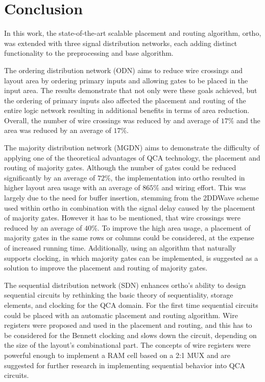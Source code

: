 \chapter{Conclusion}

In this work, the state-of-the-art scalable placement and routing algorithm, ortho, was extended with three signal distribution networks, each adding distinct functionality to the preprocessing and base algorithm.

The ordering distribution network (ODN) aims to reduce wire crossings and layout area by ordering primary inputs and allowing gates to be placed in the input area. The results demonstrate that not only were these goals achieved, but the ordering of primary inputs also affected the placement and routing of the entire logic network resulting in additional benefits in terms of area reduction. Overall, the number of wire crossings was reduced by and average of $17\%$ and the area was reduced by an average of $17\%$.

The majority distribution network (MGDN) aims to demonstrate the difficulty of applying one of the theoretical advantages of QCA technology, the placement and routing of majority gates. Although the number of gates could be reduced significantly by an average of $72\%$, the implementation into ortho resulted in higher layout area usage with an average of $865\%$ and wiring effort. This was largely due to the need for buffer insertion, stemming from the 2DDWave scheme used within ortho in combination with the signal delay caused by the placement of majority gates. However it has to be mentioned, that wire crossings were reduced by an average of $40\%$. To improve the high area usage, a placement of majority gates in the same rows or columns could be considered, at the expense of increased running time. Additionally, using an algorithm that naturally supports clocking, in which majority gates can be implemented, is suggested as a solution to improve the placement and routing of majority gates.

The sequential distribution network (SDN) enhances ortho's ability to design sequential circuits by rethinking the basic theory of sequentiality, storage elements, and clocking for the QCA domain. For the first time sequential circuits could be placed with an automatic placement and routing algorithm. Wire registers were proposed and used in the placement and routing, and this has to be considered for the Bennett clocking and slows down the circuit, depending on the size of the layout's combinational part. The concepts of wire registers were powerful enough to implement a RAM cell based on a 2:1 MUX and are suggested for further research in implementing sequential behavior into QCA circuits.